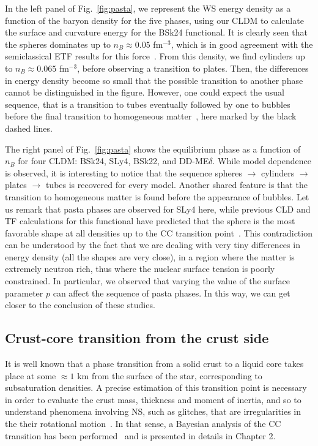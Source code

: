 In the left panel of Fig.~\ref{fig:pasta}, we represent the WS energy density
as a function of the baryon density for the five phases, using our CLDM to 
calculate the surface and curvature energy for the BSk24 functional. It is
clearly seen that the spheres dominates up to $n_B \approx 0.05$ fm$^{-3}$,
which is in good agreement with the semiclassical ETF results for this
force~\cite{Pearson2020}. From this density, we find cylinders up to $n_B
\approx 0.065$ fm$^{-3}$, before observing a transition to plates. Then, the
differences in energy density become so small that the possible transition to 
another phase cannot be distinguished in the figure. However, one could expect
the usual sequence, that is a transition to tubes eventually followed by one to 
bubbles before the final transition to homogeneous
matter~\cite{Ravenhall1983}, here marked by the black dashed lines.

The right panel of Fig.~\ref{fig:pasta} shows the equilibrium phase as a
function of $n_B$ for four CLDM: BSk24, SLy4, BSk22, and DD-ME$\delta$. While
model dependence is observed, it is interesting to notice that the 
sequence spheres $\rightarrow$ cylinders $\rightarrow$ plates $\rightarrow$ 
tubes is recovered for every model. Another shared feature is that the 
transition to homogeneous matter is found before the appearance of bubbles.
Let us remark that pasta phases are observed for SLy4 here, while previous CLD 
and TF calculations for this functional have predicted that the sphere is 
the most favorable shape at all densities up to the CC 
transition point~\cite{Douchin2000a, Vinas2017}. This contradiction can be
understood by the fact that we are dealing with very tiny differences in
energy density (all the shapes are very close), in a region where the matter is 
extremely neutron rich, thus
where the nuclear surface tension is poorly constrained. In particular, we 
observed that varying the value of the surface parameter $p$ can affect the 
sequence of pasta phases. In this way, we can get closer to the conclusion of
these studies.

\subsection{Crust-core transition from the crust side}\label{subsec:ccfromc}

It is well known that a phase transition from a solid crust to a liquid core
takes place at some $\approx 1$ km from the surface of the star, corresponding 
to subsaturation densities. A precise estimation of this transition point is 
necessary in order to evaluate the crust mass, thickness and moment of inertia, 
and so to understand phenomena involving NS, such as glitches, that are 
irregularities in the their rotational motion~\cite{Espinoza2011}. In that 
sense, a Bayesian analysis of the CC transition has been 
performed~\cite{Carreau2019cc} and is presented in details in Chapter 2. 

